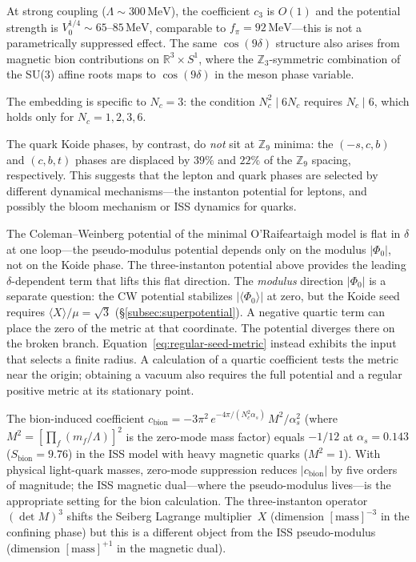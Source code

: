 \documentclass[12pt,a4paper]{article}
\newcommand{\MeV}{\,\text{MeV}}
\begin{document}
At strong coupling ($\Lambda \sim 300\MeV$), the coefficient
$c_3$ is $O(1)$ and the potential strength is
$V_0^{1/4} \sim 65\text{--}85\MeV$, comparable to
$f_\pi = 92\MeV$---this is not a parametrically suppressed effect.
The same $\cos(9\delta)$ structure also arises from magnetic
bion contributions on $\mathbb{R}^3 \times S^1$, where the
$\mathbb{Z}_3$-symmetric combination of the SU(3) affine roots
maps to $\cos(9\delta)$ in the meson phase variable.

The embedding is specific to $N_c = 3$: the condition
$N_c^2 \mid 6N_c$ requires $N_c \mid 6$, which holds only for
$N_c = 1, 2, 3, 6$.

The quark Koide phases, by contrast, do \emph{not} sit at
$\mathbb{Z}_9$ minima: the $(-s,c,b)$ and $(c,b,t)$ phases
are displaced by $39\%$ and $22\%$ of the $\mathbb{Z}_9$
spacing, respectively.  This suggests that the lepton and quark
phases are selected by different dynamical mechanisms---the
instanton potential for leptons, and possibly the bloom mechanism
or ISS dynamics for quarks.

The Coleman--Weinberg potential of the minimal O'Raifeartaigh model
is flat in $\delta$ at one loop---the pseudo-modulus potential depends
only on the modulus $|\Phi_0|$, not on the Koide phase.  The
three-instanton potential above provides the leading
$\delta$-dependent term that lifts this flat direction.
The \emph{modulus} direction $|\Phi_0|$ is a separate question:
the CW potential stabilizes $|\langle\Phi_0\rangle|$ at zero,
but the Koide seed requires $\langle X\rangle/\mu = \sqrt{3}$
(\S\ref{subsec:superpotential}).
A negative quartic term can place the zero of the metric at that coordinate.
The potential diverges there on the broken branch.
Equation~\eqref{eq:regular-seed-metric} instead exhibits the input that
selects a finite radius. A calculation of a quartic coefficient tests the
metric near the origin; obtaining a vacuum also requires the full potential
and a regular positive metric at its stationary point.

The bion-induced coefficient
$c_{\text{bion}} = -3\pi^2\,e^{-4\pi/(N_c^2\alpha_s)}\,M^2/\alpha_s^2$
(where $M^2 = [\prod_f(m_f/\Lambda)]^2$ is the zero-mode mass factor)
equals $-1/12$ at $\alpha_s = 0.143$ ($S_{\text{bion}} = 9.76$)
in the ISS model with heavy magnetic quarks ($M^2 = 1$).
With physical light-quark masses, zero-mode suppression reduces
$|c_{\text{bion}}|$ by five orders of magnitude; the ISS magnetic
dual---where the pseudo-modulus lives---is the appropriate
setting for the bion calculation.
The three-instanton operator $(\det M)^3$ shifts the Seiberg
Lagrange multiplier~$X$ (dimension $[\text{mass}]^{-3}$ in the
confining phase) but this is a different object from the ISS
pseudo-modulus (dimension $[\text{mass}]^{+1}$ in the magnetic
dual).
\end{document}
